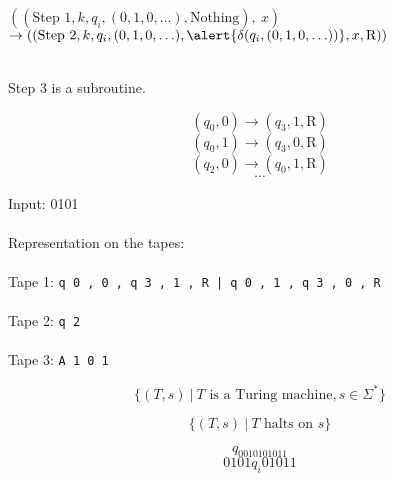 \documentclass[
  ignorenonframetext,
]{beamer}
\begin{document}
\begin{frame}
$((\text{Step 1}, k, q_i, (0,1, 0, \ldots), \text{Nothing}),\  x)$\\ $\to ((\text{Step 2}, k, q_i, (0, 1, 0, \ldots), \alert{\delta(q_i, (0,1,0,\ldots))}, x, \text{R}))$\\~\\\pause


Step 3 is a subroutine.
\end{frame}

\begin{frame}
$$(q_0, 0) \to (q_3, 1, \text{R})$$
$$(q_0, 1) \to (q_3, 0, \text{R})$$
$$(q_2, 0) \to (q_0, 1, \text{R})$$
$$\cdots$$

Input: 0101\\~\\\pause
Representation on the tapes:\\~\\
Tape 1: {\tt q 0 , 0 , q 3 , 1 , R | q 0 , 1 , q 3 , 0 , R}\\~\\
Tape 2: {\tt q 2 }\\~\\
Tape 3: {\tt A 1 0 1 }

\end{frame}

\begin{frame}
$$\{(T, s)\ |\ T\text{ is a Turing machine}, s \in \Sigma^*\}$$

$$\{(T, s)\ |\ T\text{ halts on } s\}$$
\end{frame}

\begin{frame}
$$q_0010101011$$
$$0101q_i01011$$
\end{frame}
\end{document}
